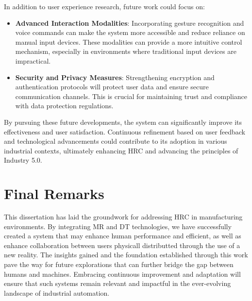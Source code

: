 In addition to user experience research, future work could focus on:

\begin{itemize} 

    \item \textbf{Advanced Interaction Modalities}: Incorporating gesture recognition and voice commands can make the system more accessible and reduce reliance on manual input devices. These modalities can provide a more intuitive control mechanism, especially in environments where traditional input devices are impractical.
    
    \item \textbf{Security and Privacy Measures}: Strengthening encryption and authentication protocols will protect user data and ensure secure communication channels. This is crucial for maintaining trust and compliance with data protection regulations.
\end{itemize}

By pursuing these future developments, the system can significantly improve its effectiveness and user satisfaction. Continuous refinement based on user feedback and technological advancements could contribute to its adoption in various industrial contexts, ultimately enhancing \ac{HRC} and advancing the principles of Industry 5.0.

\section{Final Remarks}

This dissertation has laid the groundwork for addressing \ac{HRC} in manufacturing environments. By integrating \ac{MR} and \ac{DT} technologies, we have successfully created a system that may enhance human performance and efficient, as well as enhance collaboration between users physicall distributted through the use of a new reality. The insights gained and the foundation established through this work pave the way for future explorations that can further bridge the gap between humans and machines. Embracing continuous improvement and adaptation will ensure that such systems remain relevant and impactful in the ever-evolving landscape of industrial automation.